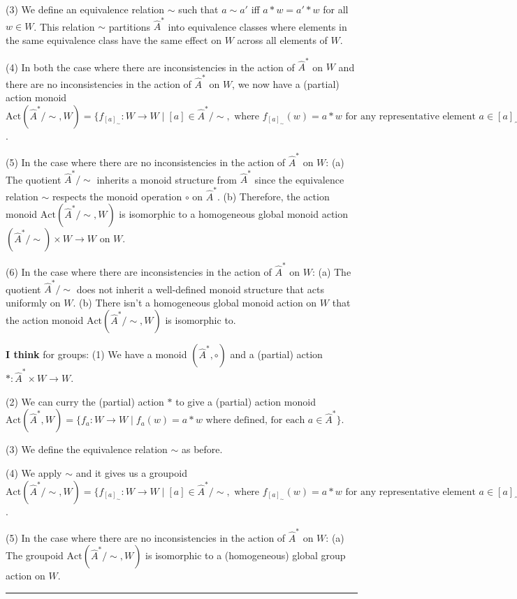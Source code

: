(3) We define an equivalence relation $\sim$ such that $a \sim a'$ iff $a \ast w = a' \ast w$ for all $w \in W$.
This relation $\sim$ partitions $\hat{A}^{\ast}$ into equivalence classes where elements in the same equivalence class have the same effect on $W$ across all elements of $W$.

(4) In both the case where there are inconsistencies in the action of $\hat{A}^{\ast}$ on $W$ and there are no inconsistencies in the action of $\hat{A}^{\ast}$ on $W$, we now have a (partial) action monoid $\text{Act}(\hat{A}^{\ast} / \sim, W) = \{ f_{[a]_{\sim}} : W \to W \mid [a] \in \hat{A}^{\ast} / \sim, \text{ where } f_{[a]_{\sim}}(w) = a \ast w \text{ for any representative element } a \in [a]_{\sim} \}$.

(5) In the case where there are no inconsistencies in the action of $\hat{A}^{\ast}$ on $W$:
    (a) The quotient $\hat{A}^{\ast}/\sim$ inherits a monoid structure from $\hat{A}^{\ast}$ since the equivalence relation $\sim$ respects the monoid operation $\circ$ on $\hat{A}^{\ast}$.
    (b) Therefore, the action monoid $\text{Act}(\hat{A}^{\ast} / \sim, W)$ is isomorphic to a homogeneous global monoid action $(\hat{A}^{\ast}/\sim) \times W \to W$ on $W$.

(6) In the case where there are inconsistencies in the action of $\hat{A}^{\ast}$ on $W$:
    (a) The quotient $\hat{A}^{\ast}/\sim$ does not inherit a well-defined monoid structure that acts uniformly on $W$.
    (b) There isn't a homogeneous global monoid action on $W$ that the action monoid $\text{Act}(\hat{A}^{\ast} / \sim, W)$ is isomorphic to. 


\textbf{I think} for groups:
(1) We have a monoid $(\hat{A}^{\ast}, \circ)$ and a (partial) action $\ast: \hat{A}^{\ast} \times W \to W$.

(2) We can curry the (partial) action $\ast$ to give a (partial) action monoid $\text{Act}(\hat{A}^{\ast}, W) = \{f_{a}: W \to W \mid f_{a}(w) = a \ast w \text{ where defined, for each } a \in \hat{A}^{\ast} \}$.

(3) We define the equivalence relation $\sim$ as before.

(4) We apply $\sim$ and it gives us a groupoid $\text{Act}(\hat{A}^{\ast} / \sim, W) = \{ f_{[a]_{\sim}} : W \to W \mid [a] \in \hat{A}^{\ast} / \sim, \text{ where } f_{[a]_{\sim}}(w) = a \ast w \text{ for any representative element } a \in [a]_{\sim} \}$.

(5) In the case where there are no inconsistencies in the action of $\hat{A}^{\ast}$ on $W$:
    (a) The groupoid $\text{Act}(\hat{A}^{\ast} / \sim, W)$ is isomorphic to a (homogeneous) global group action on $W$.
\noindent\rule{\textwidth}{1mm}

